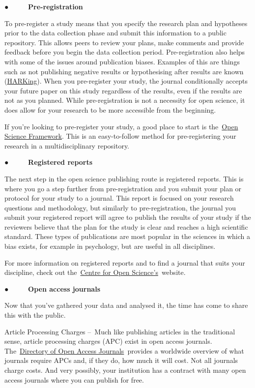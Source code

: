 \documentclass[
]{book}
\begin{document}
● ~ ~ ~ \textbf{Pre-registration}

To pre-register a study means that you specify the research plan and hypotheses prior to the data collection phase and submit this information to a public repository. This allows peers to review your plans, make comments and provide feedback before you begin the data collection period. Pre-registration also helps with some of the issues around publication biases. Examples of this are things such as not publishing negative results or hypothesising after results are known (\href{https://pubmed.ncbi.nlm.nih.gov/15647155/}{HARKing}). When you pre-register your study, the journal conditionally accepts your future paper on this study regardless of the results, even if the results are not as you planned. While pre-registration is not a necessity for open science, it does allow for your research to be more accessible from the beginning.

If you're looking to pre-register your study, a good place to start is the~\href{https://www.cos.io/initiatives/prereg}{Open Science Framework}. This is an easy-to-follow method for pre-registering your research in a multidisciplinary repository.

● ~ ~ ~ \textbf{Registered reports}

The next step in the open science publishing route is registered reports. This is where you go a step further from pre-registration and you submit your plan or protocol for your study to a journal. This report is focused on your research questions and methodology, but similarly to pre-registration, the journal you submit your registered report will agree to publish the results of your study if the reviewers believe that the plan for the study is clear and reaches a high scientific standard. These types of publications are most popular in the sciences in which a bias exists, for example in psychology, but are useful in all disciplines.

For more information on registered reports and to find a journal that suits your discipline, check out the~\href{https://www.cos.io/initiatives/registered-reports}{Centre for Open Science's}~website.

● ~ ~ ~ \textbf{Open access journals}

Now that you've gathered your data and analysed it, the time has come to share this with the public.

Article Processing Charges --~Much like publishing articles in the traditional sense, article processing charges (APC) exist in open access journals. The~\href{https://doaj.org/}{Directory of Open Access Journals}~provides a worldwide overview of what journals require APCs and, if they do, how much it will cost. Not all journals charge costs. And very possibly, your institution has a contract with many open access journals where you can publish for free.
\end{document}
